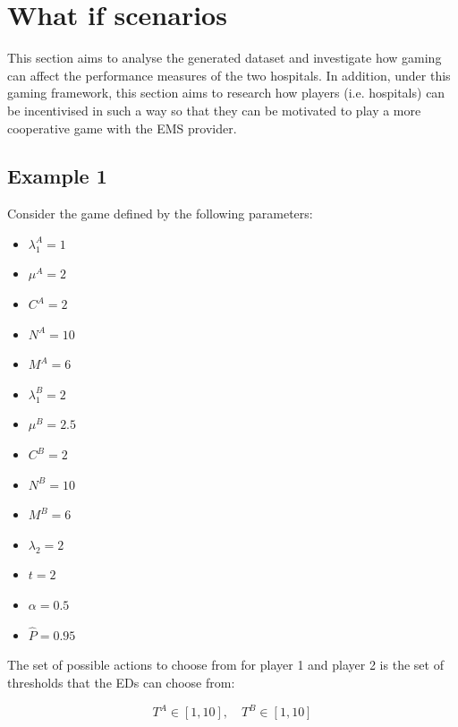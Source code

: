 \section{What if scenarios}\label{sec:results_what_if}

This section aims to analyse the generated dataset and investigate how
gaming can affect the performance measures of the two hospitals.
In addition, under this gaming framework, this section aims to research how
players (i.e. hospitals) can be incentivised in such a way so that they can be
motivated to play a more cooperative game with the EMS provider.


\subsection{Example 1}

Consider the game defined by the following parameters:

\begin{multicols}{3}
    \begin{itemize}
        \item \( \lambda_1^A = 1 \)
        \item \( \mu^A = 2 \)
        \item \( C^A = 2 \)
        \item \( N^A = 10 \)
        \item \( M^A = 6 \)
        \columnbreak

        \item \( \lambda_1^B = 2 \)
        \item \( \mu^B = 2.5 \)
        \item \( C^B = 2 \)
        \item \( N^B = 10 \)
        \item \( M^B = 6 \)
        \columnbreak

        \item \( \lambda_2 = 2 \)
        \item \( t = 2 \)
        \item \( \alpha = 0.5 \)
        \item \( \hat{P} = 0.95 \)
    \end{itemize}
\end{multicols}

The set of possible actions to choose from for player 1 and player 2 is the
set of thresholds that the EDs can choose from: 

\begin{equation}
    T^A \in [1, 10], \quad T^B \in [1, 10]
\end{equation}


